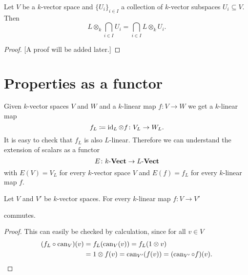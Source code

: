 \begin{lem}
  Let $V$ be a $k$-vector space and $\{U_i\}_{i \in I}$ a collection of $k$-vector subspaces $U_i \subseteq V$.
  Then
  \[
      L \otimes_k \bigcap_{i \in I} U_i
    = \bigcap_{i \in I} L \otimes_k U_i.
  \]
\end{lem}
\begin{proof}
  {[A proof will be added later.]}
\end{proof}





\section{Properties as a functor}


Given $k$-vector spaces $V$ and $W$ and a $k$-linear map $f \colon V \to W$ we get a $k$-linear map
\[
            f_L
  \coloneqq \operatorname{id}_L \otimes f
  \colon    V_L
  \to       W_L.
\]
It is easy to check that $f_L$ is also $L$-linear.
Therefore we can understand the extension of scalars as a functor
\[
  E \colon k\text{-}\mathbf{Vect} \to L\text{-}\mathbf{Vect}
\]
with $E(V) = V_L$ for every $k$-vector space $V$ and $E(f) = f_L$ for every $k$-linear map $f$. 

\begin{lem}
  Let $V$ and $V'$ be $k$-vector spaces.
  For every $k$-linear map $f \colon V \to V'$
  \begin{center}
  \end{center}
  commutes.
\end{lem}
\begin{proof}
  This can easily be checked by calculation, since for all $v \in V$
  \begin{align*}
        (f_L \circ \operatorname{can}_V)(v)
    &=  f_L(\operatorname{can}_V(v))
     =  f_L(1 \otimes v) \\
    &=  1 \otimes f(v)
     =  \operatorname{can}_{V'}(f(v))
     =  (\operatorname{can}_{V'} \circ f)(v).
    \qedhere
  \end{align*}
\end{proof}


